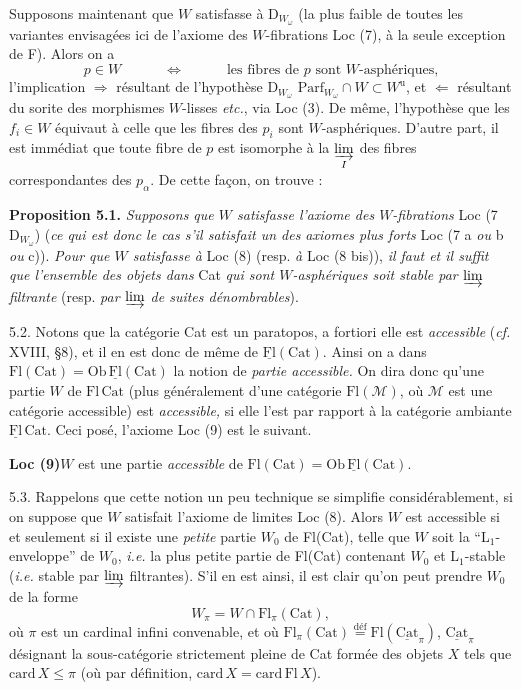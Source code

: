 \documentclass[11pt]{article}
\newcommand{\printedpage}[1]{\marginpar{\footnotesize p.~#1}}
\newcommand{\msp}[1]{\marginpar{\footnotesize [#1]}}
\newcommand{\uFl}{\underline{\mathrm{Fl}}}
\newcommand{\uCat}{\underline{\mathrm{Cat}}}
\newcommand{\Parf}{\mathrm{Parf}}
\begin{document}
Supposons maintenant que $W$ satisfasse à $\mathrm{D}_{W_\omega}$ (la plus faible de toutes les variantes envisagées ici de l'axiome des $W$-fibrations Loc (7), à la seule exception de F). Alors on a
\[
p \in W \qquad\quad \Longleftrightarrow \qquad\quad \text{les fibres de $p$ sont $W$-asphériques,}
\]
\printedpage{41}
l'implication $\Longrightarrow$ résultant de l'hypothèse $\mathrm{D}_{W_\omega}$ $\Parf_{W_\omega} \cap W \subset W^{\mathrm{u}}$, et $\Longleftarrow$ résultant du sorite des morphismes $W$-lisses \textit{etc.}, via Loc (3). De même, l'hypothèse que les $f_i \in W$ équivaut à celle que les fibres des $p_i$ sont $W$-asphériques. D'autre part, il est immédiat que
\msp{page 74}
toute fibre de $p$ est isomorphe à la $\varinjlim\limits_{I}$ des fibres correspondantes des $p_\alpha$. De cette façon, on trouve :

\textbf{Proposition 5.1.} \textit{Supposons que $W$ satisfasse l'axiome des $W$-fibrations} Loc (7 $\mathrm{D}_{W_\omega}$) (\textit{ce qui est donc le cas s'il satisfait un des axiomes plus forts} Loc (7 a \textit{ou} b \textit{ou} c)). \textit{Pour que $W$ satisfasse à} Loc (8) (resp. \textit{à} Loc (8 bis)), \textit{il faut et il suffit que l'ensemble des objets dans} Cat \textit{qui sont $W$-asphériques soit stable par $\varinjlim$ filtrante} (resp. \textit{par $\varinjlim$ de suites dénombrables}).

5.2. Notons que la catégorie Cat est un paratopos, a fortiori elle est \textit{accessible} (\textit{cf.} XVIII, §8), et il en est donc de même de $\uFl(\mathrm{Cat})$. Ainsi on a dans $\mathrm{Fl}(\mathrm{Cat}) = \mathrm{Ob}\,\uFl(\mathrm{Cat})$ la notion de \textit{partie accessible.} On dira donc qu'une partie $W$ de $\mathrm{Fl}\,\mathrm{Cat}$ (plus généralement d'une catégorie $\mathrm{Fl}(\mathcal{M})$, où $\mathcal{M}$ est une catégorie accessible) est \textit{accessible,} si elle l'est par rapport à la catégorie ambiante
\msp{page 75}
$\uFl\,\mathrm{Cat}$. Ceci posé, l'axiome Loc (9) est le suivant.

\textbf{Loc (9)}\quad $W$ est une partie \textit{accessible} de $\mathrm{Fl}(\mathrm{Cat}) = \mathrm{Ob}\,\uFl(\mathrm{Cat})$.

5.3. Rappelons que cette notion un peu technique se simplifie considérablement, si on suppose que $W$ satisfait l'axiome de limites Loc (8). Alors $W$ est accessible si et seulement si il existe une \textit{petite} partie $W_0$ de Fl(Cat), telle que $W$ soit la ``L$_1$-enveloppe'' de $W_0$, \textit{i.e.} la plus petite partie de Fl(Cat) contenant $W_0$ et L$_1$-stable (\textit{i.e.} stable par $\varinjlim$ filtrantes). S'il en est ainsi, il est clair qu'on peut prendre $W_0$ de la forme
\[
W_\pi = W \cap \mathrm{Fl}_\pi(\mathrm{Cat}),
\]
où $\pi$ est un cardinal infini convenable, et où $\mathrm{Fl}_\pi(\mathrm{Cat}) \overset{\text{déf}}{=} \mathrm{Fl}(\uCat_\pi)$, $\uCat_\pi$ désignant la sous-catégorie strictement pleine de Cat formée des objets $X$ tels que $\mathrm{card}\,X \leq \pi$ (où par définition, $\mathrm{card}\,X = \mathrm{card}\,\mathrm{Fl}\,X$).
\end{document}
